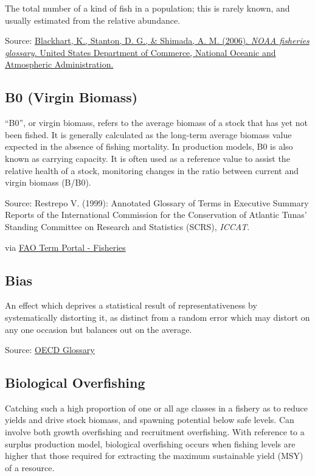 \documentclass[
  11pt,
]{book}
\begin{document}
The total number of a kind of ﬁsh in a population; this is rarely known, and usually estimated from the relative abundance.

Source: \href{https://repository.library.noaa.gov/view/noaa/12856}{Blackhart, K., Stanton, D. G., \& Shimada, A. M. (2006). \emph{NOAA fisheries glossary.} United States Department of Commerce, National Oceanic and Atmospheric Administration.}

\hypertarget{b0-virgin-biomass}{%
\subsection{B0 (Virgin Biomass)}\label{b0-virgin-biomass}}

``B0'', or virgin biomass, refers to the average biomass of a stock that has yet not been fished. It is generally calculated as the long-term average biomass value expected in the absence of fishing mortality. In production models, B0 is also known as carrying capacity. It is often used as a reference value to assist the relative health of a stock, monitoring changes in the ratio between current and virgin biomass (B/B0).

Source: Restrepo V. (1999): Annotated Glossary of Terms in Executive Summary Reports of the International Commission for the Conservation of Atlantic Tunas' Standing Committee on Research and Statistics (SCRS), \emph{ICCAT}.

via \href{http://www.fao.org/fishery/glossary/en}{FAO Term Portal - Fisheries}

\hypertarget{bias}{%
\subsection{Bias}\label{bias}}

An effect which deprives a statistical result of representativeness by systematically distorting it, as distinct from a random error which may distort on any one occasion but balances out on the average.

Source: \href{https://stats.oecd.org/glossary/detail.asp?ID=3605}{OECD Glossary}

\hypertarget{biological-overfishing}{%
\subsection{Biological Overfishing}\label{biological-overfishing}}

Catching such a high proportion of one or all age classes in a fishery as to reduce yields and drive stock biomass, and spawning potential below safe levels. Can involve both growth overfishing and recruitment overfishing. With reference to a surplus production model, biological overfishing occurs when fishing levels are higher that those required for extracting the maximum sustainable yield (MSY) of a resource.
\end{document}
